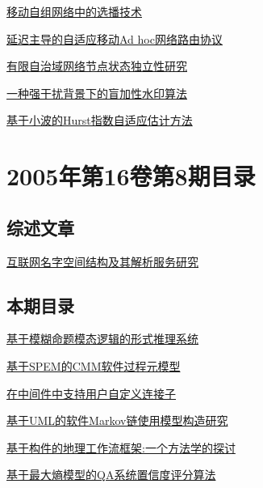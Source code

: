 \documentclass[a4paper]{article}
\begin{document}
\href{http://www.jos.org.cn/ch/reader/download_pdf.aspx?file_no=20050915&year_id=2005&quarter_id=9&falg=1}{移动自组网络中的选播技术}

\href{http://www.jos.org.cn/ch/reader/download_pdf.aspx?file_no=20050916&year_id=2005&quarter_id=9&falg=1}{延迟主导的自适应移动Ad hoc网络路由协议}

\href{http://www.jos.org.cn/ch/reader/download_pdf.aspx?file_no=20050917&year_id=2005&quarter_id=9&falg=1}{有限自治域网络节点状态独立性研究}

\href{http://www.jos.org.cn/ch/reader/download_pdf.aspx?file_no=20050918&year_id=2005&quarter_id=9&falg=1}{一种强干扰背景下的盲加性水印算法}

\href{http://www.jos.org.cn/ch/reader/download_pdf.aspx?file_no=20050919&year_id=2005&quarter_id=9&falg=1}{基于小波的Hurst指数自适应估计方法}


\section{\textbf{2005年第16卷第8期目录}}
\subsection{综述文章}
\href{http://www.jos.org.cn/ch/reader/download_pdf.aspx?file_no=20050811&year_id=2005&quarter_id=8&falg=1}{互联网名字空间结构及其解析服务研究}

\subsection{本期目录}
\href{http://www.jos.org.cn/ch/reader/download_pdf.aspx?file_no=20050801&year_id=2005&quarter_id=8&falg=1}{基于模糊命题模态逻辑的形式推理系统}

\href{http://www.jos.org.cn/ch/reader/download_pdf.aspx?file_no=20050802&year_id=2005&quarter_id=8&falg=1}{基于SPEM的CMM软件过程元模型}

\href{http://www.jos.org.cn/ch/reader/download_pdf.aspx?file_no=20050803&year_id=2005&quarter_id=8&falg=1}{在中间件中支持用户自定义连接子}

\href{http://www.jos.org.cn/ch/reader/download_pdf.aspx?file_no=20050804&year_id=2005&quarter_id=8&falg=1}{基于UML的软件Markov链使用模型构造研究}

\href{http://www.jos.org.cn/ch/reader/download_pdf.aspx?file_no=20050805&year_id=2005&quarter_id=8&falg=1}{基于构件的地理工作流框架:一个方法学的探讨}

\href{http://www.jos.org.cn/ch/reader/download_pdf.aspx?file_no=20050806&year_id=2005&quarter_id=8&falg=1}{基于最大熵模型的QA系统置信度评分算法}
\end{document}
